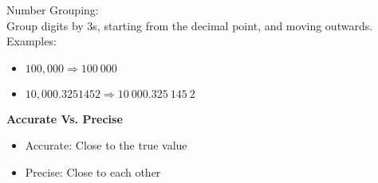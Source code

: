 \documentclass[]{article}
\begin{document}
Number Grouping:\\
Group digits by 3s, starting from the decimal point, and moving outwards.
Examples:
\begin{itemize}
    \item $100,000 \Rightarrow 100\ 000$
    \item $10,000.3251452 \Rightarrow 10\ 000.325\ 145\ 2$
\end{itemize}

\textbf{Accurate Vs. Precise}
\begin{itemize}
    \item Accurate: Close to the true value
    \item Precise: Close to each other
\end{itemize}
\end{document}
